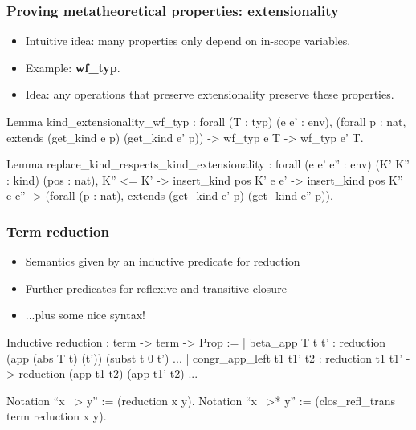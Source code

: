 \documentclass{beamer}
\begin{document}
\begin{frame}[fragile]
\frametitle{Proving metatheoretical properties: extensionality}
\begin{itemize}
  \item Intuitive idea: many properties only depend on in-scope variables.
  \item Example: \textbf{wf\_typ}.
  \item Idea: any operations that preserve extensionality preserve these properties.
\end{itemize}

\begin{pyglist}[fontsize=\scriptsize]
  Lemma kind_extensionality_wf_typ :
    forall (T : typ) (e e' : env),
      (forall p : nat, extends (get_kind e p) (get_kind e' p)) -> 
      wf_typ e T -> wf_typ e' T.
      
  Lemma replace_kind_respects_kind_extensionality :
    forall (e e' e'' : env) (K' K'' : kind) (pos : nat),
      K'' <= K' ->
      insert_kind pos K' e e' ->
      insert_kind pos K'' e e'' ->
      (forall (p : nat), extends (get_kind e' p) (get_kind e'' p)).
\end{pyglist}
\end{frame}


\begin{frame}[fragile]
\frametitle{Term reduction}
\begin{itemize}
  \item Semantics given by an inductive predicate for reduction
  \item Further predicates for reflexive and transitive closure
  \item ...plus some nice syntax!
\end{itemize}

\begin{pyglist}[fontsize=\scriptsize]
Inductive reduction : term -> term -> Prop :=
| beta_app T t t' :
    reduction (app (abs T t) (t')) (subst t 0 t')
...
| congr_app_left t1 t1' t2 :
    reduction t1 t1' ->
    reduction (app t1 t2) (app t1' t2)
...
    
Notation ``x ~> y'' := (reduction x y).
Notation ``x ~>* y'' := (clos_refl_trans term reduction x y).
\end{pyglist}
\end{frame}
\end{document}
